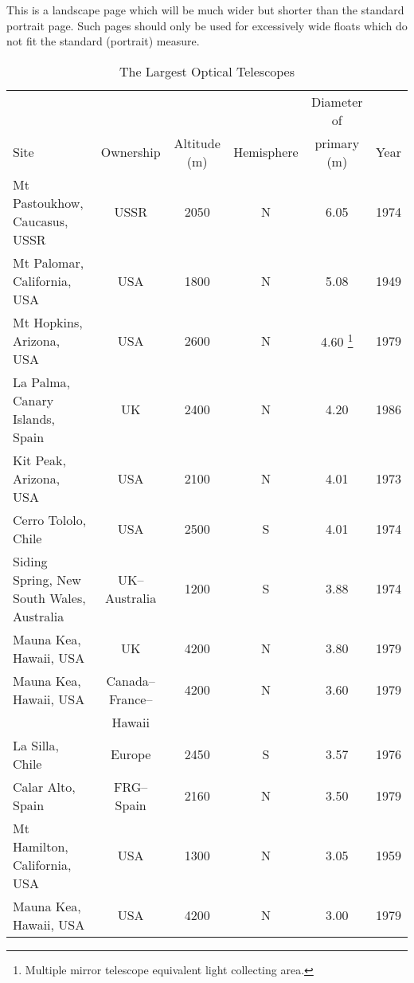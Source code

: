 



This is a landscape page which will be much wider but shorter than the
standard portrait page. Such pages should only be used for excessively
wide floats which do not fit the standard (portrait) measure.

\setcounter{chapter}{3}
\setcounter{table}{0}
\begin{table*}
 \caption{The Largest Optical Telescopes}
 \label{tab1}
\begin{tabular}{lccccc}
 \hline \hline
      &           &              &            &  Diameter of & \\
 Site & Ownership & Altitude (m) & Hemisphere &  primary (m) & Year\\
 \hline
 Mt Pastoukhow, Caucasus, USSR   & USSR & 2050 & N & 6.05 & 1974\\
 Mt Palomar, California, USA     & USA  & 1800 & N & 5.08 & 1949\\
 Mt Hopkins, Arizona, USA        & USA  & 2600 & N & \phantom{$^a$}4.60%
  \footnote{Multiple mirror telescope equivalent
                                  light collecting area.} & 1979\\
 La Palma, Canary Islands, Spain & UK & 2400 & N & 4.20 & 1986\\
 Kit Peak, Arizona, USA          & USA  & 2100 & N & 4.01 & 1973\\
 Cerro Tololo, Chile             & USA  & 2500 & S & 4.01 & 1974\\
 Siding Spring, New South Wales,
    Australia         & UK--Australia   & 1200 & S & 3.88 & 1974\\
 Mauna Kea, Hawaii, USA          &  UK  & 4200 & N & 3.80 & 1979\\
 Mauna Kea, Hawaii, USA          &
                      Canada--France--  & 4200 & N & 3.60 & 1979\\
                               & Hawaii &      &   &      &     \\
 La Silla, Chile               & Europe & 2450 & S & 3.57 & 1976\\
 Calar Alto, Spain         & FRG--Spain & 2160 & N & 3.50 & 1979\\
 Mt Hamilton, California, USA    & USA  & 1300 & N & 3.05 & 1959\\
 Mauna Kea, Hawaii, USA          & USA  & 4200 & N & 3.00 & 1979\\
 \hline \hline
\end{tabular}
%
\end{table*}

